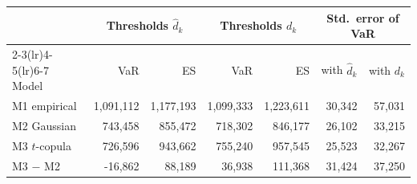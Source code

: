 \begin{tabular}{lrrrrrr}
\toprule
 & \multicolumn{2}{c}{Thresholds $\hat d_k$} & \multicolumn{2}{c}{Thresholds $d_k$} & \multicolumn{2}{c}{Std.\ error of VaR} \\
\cmidrule(lr){2-3}\cmidrule(lr){4-5}\cmidrule(lr){6-7}
Model & VaR & ES & VaR & ES & with $\hat d_k$ & with $d_k$ \\
\midrule
M1 empirical & 1,091,112 & 1,177,193 & 1,099,333 & 1,223,611 & 30,342 & 57,031 \\
M2 Gaussian & 743,458 & 855,472 & 718,302 & 846,177 & 26,102 & 33,215 \\
M3 $t$-copula & 726,596 & 943,662 & 755,240 & 957,545 & 25,523 & 32,267 \\
\midrule
M3 $-$ M2 & -16,862 & 88,189 & 36,938 & 111,368 & 31,424 & 37,250 \\
\bottomrule
\end{tabular}
